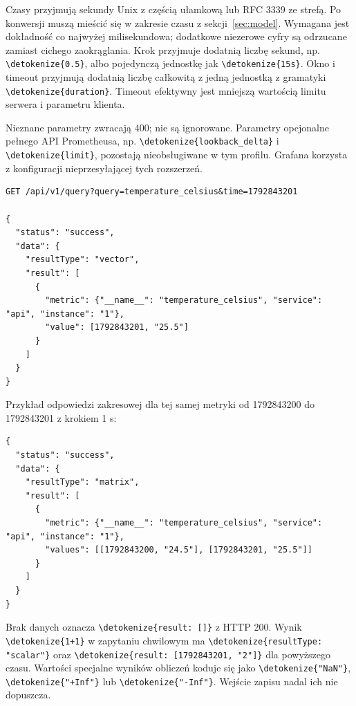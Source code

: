 \documentclass[11pt,a4paper]{article}
\newcommand{\code}[1]{\expandafter\nolinkurl\expandafter{\detokenize{#1}}}
\begin{document}
Czasy przyjmują sekundy Unix z częścią ułamkową lub RFC 3339 ze strefą.
Po konwersji muszą mieścić się w zakresie czasu z sekcji~\ref{sec:model}.
Wymagana jest dokładność co najwyżej milisekundowa; dodatkowe niezerowe
cyfry są odrzucane zamiast cichego zaokrąglania. Krok przyjmuje dodatnią
liczbę sekund, np. \code{0.5}, albo pojedynczą jednostkę jak \code{15s}.
Okno i timeout przyjmują dodatnią liczbę całkowitą z jedną jednostką
z gramatyki \code{duration}. Timeout efektywny jest mniejszą wartością
limitu serwera i parametru klienta.

Nieznane parametry zwracają 400; nie są ignorowane.
Parametry opcjonalne pełnego API Prometheusa, np. \code{lookback_delta}
i \code{limit}, pozostają nieobsługiwane w tym profilu.
Grafana korzysta z konfiguracji nieprzesyłającej tych rozszerzeń.

\begin{lstlisting}
GET /api/v1/query?query=temperature_celsius&time=1792843201

{
  "status": "success",
  "data": {
    "resultType": "vector",
    "result": [
      {
        "metric": {"__name__": "temperature_celsius", "service": "api", "instance": "1"},
        "value": [1792843201, "25.5"]
      }
    ]
  }
}
\end{lstlisting}

Przykład odpowiedzi zakresowej dla tej samej metryki od 1792843200
do 1792843201 z krokiem 1 s:
\begin{lstlisting}
{
  "status": "success",
  "data": {
    "resultType": "matrix",
    "result": [
      {
        "metric": {"__name__": "temperature_celsius", "service": "api", "instance": "1"},
        "values": [[1792843200, "24.5"], [1792843201, "25.5"]]
      }
    ]
  }
}
\end{lstlisting}

Brak danych oznacza \code{result: []} z HTTP 200. Wynik \code{1+1}
w zapytaniu chwilowym ma \code{resultType: "scalar"} oraz
\code{result: [1792843201, "2"]} dla powyższego czasu.
Wartości specjalne wyników obliczeń koduje się jako \code{"NaN"},
\code{"+Inf"} lub \code{"-Inf"}. Wejście zapisu nadal ich nie dopuszcza.
\end{document}
